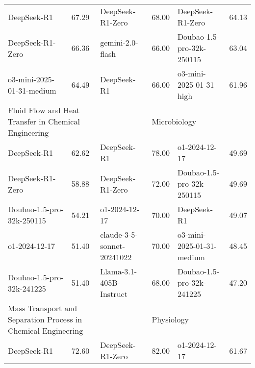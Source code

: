 {\begin{longtable}{p{4.2cm}>{\centering\arraybackslash} p{0.8cm}|p{4.2cm} >{\centering\arraybackslash} p{0.8cm}|p{4.2cm} >{\centering\arraybackslash} p{0.8cm}}
\cellcolor{blue!5} DeepSeek-R1 & \cellcolor{blue!2}67.29 & \cellcolor{red!5} DeepSeek-R1-Zero & \cellcolor{red!2} 68.00 & \cellcolor{green!5} DeepSeek-R1-Zero & \cellcolor{green!2} 64.13\\
\cellcolor{blue!5} DeepSeek-R1-Zero & \cellcolor{blue!2}66.36 & \cellcolor{red!5} gemini-2.0-flash & \cellcolor{red!2} 66.00 & \cellcolor{green!5} Doubao-1.5-pro-32k-250115 & \cellcolor{green!2} 63.04\\
\cellcolor{blue!5} o3-mini-2025-01-31-medium & \cellcolor{blue!2}64.49 & \cellcolor{red!5} DeepSeek-R1 & \cellcolor{red!2} 66.00 & \cellcolor{green!5} o3-mini-2025-01-31-high & \cellcolor{green!2} 61.96\\
\hline
\multicolumn{2}{p{5.15cm}|}{\cellcolor{blue!10} \centering Fluid Flow and Heat Transfer in Chemical Engineering} & \multicolumn{2}{p{5.15cm}|}{\cellcolor{red!10} \centering Legal Theory and Legal History} & \multicolumn{2}{p{5.15cm}}{\cellcolor{green!10} \centering Microbiology}\\
\hline
\cellcolor{blue!5} DeepSeek-R1 & \cellcolor{blue!2}62.62 & \cellcolor{red!5} DeepSeek-R1 & \cellcolor{red!2} 78.00 & \cellcolor{green!5} o1-2024-12-17 & \cellcolor{green!2} 49.69\\
\cellcolor{blue!5} DeepSeek-R1-Zero & \cellcolor{blue!2}58.88 & \cellcolor{red!5} DeepSeek-R1-Zero & \cellcolor{red!2} 72.00 & \cellcolor{green!5} Doubao-1.5-pro-32k-250115 & \cellcolor{green!2} 49.69\\
\cellcolor{blue!5} Doubao-1.5-pro-32k-250115 & \cellcolor{blue!2}54.21 & \cellcolor{red!5} o1-2024-12-17 & \cellcolor{red!2} 70.00 & \cellcolor{green!5} DeepSeek-R1 & \cellcolor{green!2} 49.07\\
\cellcolor{blue!5} o1-2024-12-17 & \cellcolor{blue!2}51.40 & \cellcolor{red!5} claude-3-5-sonnet-20241022 & \cellcolor{red!2} 70.00 & \cellcolor{green!5} o3-mini-2025-01-31-medium & \cellcolor{green!2} 48.45\\
\cellcolor{blue!5} Doubao-1.5-pro-32k-241225 & \cellcolor{blue!2}51.40 & \cellcolor{red!5} Llama-3.1-405B-Instruct & \cellcolor{red!2} 68.00 & \cellcolor{green!5} Doubao-1.5-pro-32k-241225 & \cellcolor{green!2} 47.20\\
\hline
\multicolumn{2}{p{5.15cm}|}{\cellcolor{blue!10} \centering Mass Transport and Separation Process in Chemical Engineering} & \multicolumn{2}{p{5.15cm}|}{\cellcolor{red!10} \centering Military Law} & \multicolumn{2}{p{5.15cm}}{\cellcolor{green!10} \centering Physiology}\\
\hline
\cellcolor{blue!5} DeepSeek-R1 & \cellcolor{blue!2}72.60 & \cellcolor{red!5} DeepSeek-R1-Zero & \cellcolor{red!2} 82.00 & \cellcolor{green!5} o1-2024-12-17 & \cellcolor{green!2} 61.67\\

\end{longtable}}
